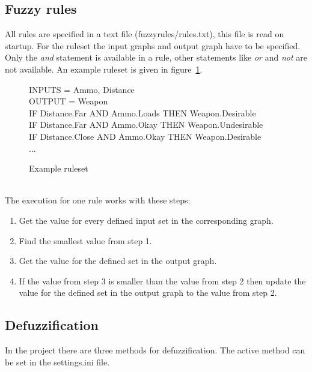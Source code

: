 \documentclass[10pt]{extarticle} %
\begin{document}
   \subsection{Fuzzy rules}
   All rules are specified in a text file (fuzzyrules/rules.txt), this file is read on startup. For the ruleset the input graphs and output graph have to be specified. Only the \emph{and} statement is available in a rule, other statements like \emph{or} and \emph{not} are not available. An example ruleset is given in figure~\ref{fig:ruleset}.
   \begin{figure}[h!]
   {\ttfamily 
   		INPUTS = Ammo, Distance\\
  	 	OUTPUT = Weapon\\
   		IF Distance.Far AND Ammo.Loads THEN Weapon.Desirable \\
   		IF Distance.Far	AND Ammo.Okay THEN Weapon.Undesirable \\
   		IF Distance.Close AND Ammo.Okay THEN Weapon.Desirable \\
   		...
   }
   \caption{Example ruleset}
   \label{fig:ruleset}
   \end{figure}\\
   The execution for one rule works with these steps:
   \begin{enumerate}
   \item Get the value for every defined input set in the corresponding graph.
   \item Find the smallest value from step 1.
   \item Get the value for the defined set in the output graph.
   \item If the value from step 3 is smaller than the value from step 2 then update the value for the defined set in the output graph to the value from step 2.
   \end{enumerate}
   \subsection{Defuzzification}
   In the project there are three methods for defuzzification. The active method can be set in the settings.ini file.
   
\end{document}

